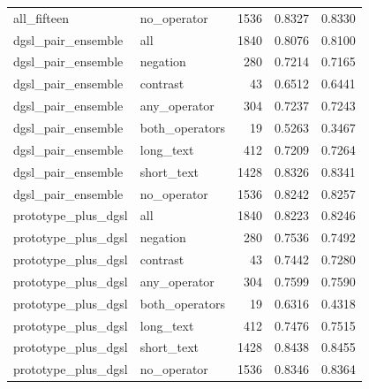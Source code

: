 \begin{tabular}{llrrr}
all\_fifteen & no\_operator & 1536 & 0.8327 & 0.8330 \\
dgsl\_pair\_ensemble & all & 1840 & 0.8076 & 0.8100 \\
dgsl\_pair\_ensemble & negation & 280 & 0.7214 & 0.7165 \\
dgsl\_pair\_ensemble & contrast & 43 & 0.6512 & 0.6441 \\
dgsl\_pair\_ensemble & any\_operator & 304 & 0.7237 & 0.7243 \\
dgsl\_pair\_ensemble & both\_operators & 19 & 0.5263 & 0.3467 \\
dgsl\_pair\_ensemble & long\_text & 412 & 0.7209 & 0.7264 \\
dgsl\_pair\_ensemble & short\_text & 1428 & 0.8326 & 0.8341 \\
dgsl\_pair\_ensemble & no\_operator & 1536 & 0.8242 & 0.8257 \\
prototype\_plus\_dgsl & all & 1840 & 0.8223 & 0.8246 \\
prototype\_plus\_dgsl & negation & 280 & 0.7536 & 0.7492 \\
prototype\_plus\_dgsl & contrast & 43 & 0.7442 & 0.7280 \\
prototype\_plus\_dgsl & any\_operator & 304 & 0.7599 & 0.7590 \\
prototype\_plus\_dgsl & both\_operators & 19 & 0.6316 & 0.4318 \\
prototype\_plus\_dgsl & long\_text & 412 & 0.7476 & 0.7515 \\
prototype\_plus\_dgsl & short\_text & 1428 & 0.8438 & 0.8455 \\
prototype\_plus\_dgsl & no\_operator & 1536 & 0.8346 & 0.8364 \\
\bottomrule
\end{tabular}
